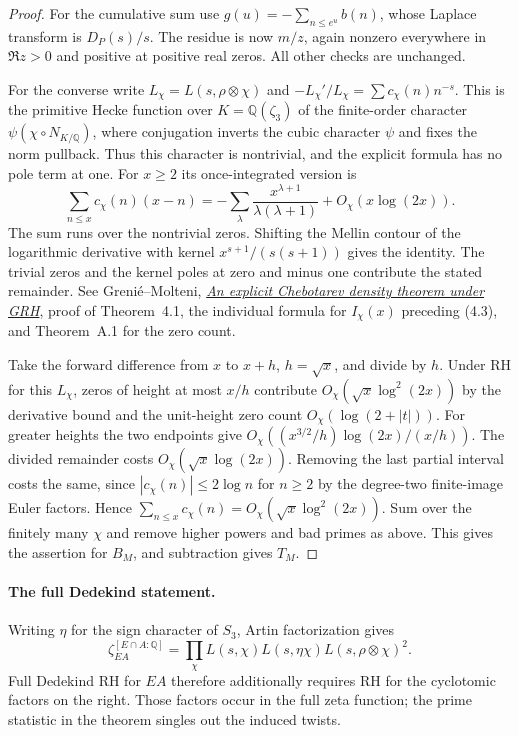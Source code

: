 \documentclass[11pt]{article}
\begin{document}
\begin{proof}
For the cumulative sum use $g(u)=-\sum_{n\le e^u}b(n)$, whose Laplace
transform is $D_P(s)/s$. The residue is now $m/z$, again nonzero
everywhere in $\Re z>0$ and positive at positive real zeros. All other
checks are unchanged.

For the converse write $L_\chi=L(s,\rho\otimes\chi)$ and
$-L_\chi'/L_\chi=\sum c_\chi(n)n^{-s}$. This is the primitive Hecke
function over $K=\mathbb Q(\zeta_3)$ of the finite-order character
$\psi(\chi\circ N_{K/\mathbb Q})$, where conjugation inverts the cubic
character $\psi$ and fixes the norm pullback. Thus this character is
nontrivial, and the explicit formula has no pole term at one.
For $x\ge2$ its once-integrated version is
\[
 \sum_{n\le x}c_\chi(n)(x-n)
 =-\sum_{\lambda}\frac{x^{\lambda+1}}{\lambda(\lambda+1)}
       +O_\chi(x\log(2x)).
\]
The sum runs over the nontrivial zeros. Shifting the Mellin contour of
the logarithmic derivative with kernel $x^{s+1}/(s(s+1))$ gives the
identity. The trivial zeros and the kernel poles at zero and minus one
contribute the stated remainder. See Greni\'e--Molteni,
\href{https://sites.unimi.it/molteni/research/papers-pdf/44-molteni-An_explicit_Chebotarev_density_theorem_under_GRH.pdf}{\emph{An explicit Chebotarev density theorem under GRH}},
proof of Theorem~4.1, the individual formula for $I_\chi(x)$ preceding
(4.3), and Theorem~A.1 for the zero count.

Take the forward difference from $x$ to $x+h$, $h=\sqrt x$, and divide
by $h$. Under RH for this $L_\chi$, zeros of height at most $x/h$ contribute
$O_\chi(\sqrt x\log^2(2x))$ by the derivative bound and the unit-height
zero count $O_\chi(\log(2+|t|))$. For greater heights the two endpoints
give $O_\chi((x^{3/2}/h)\log(2x)/(x/h))$. The divided remainder costs
$O_\chi(\sqrt x\log(2x))$. Removing the last partial interval costs the
same, since $|c_\chi(n)|\le2\log n$ for $n\ge2$ by the degree-two
finite-image Euler factors. Hence
$\sum_{n\le x}c_\chi(n)=O_\chi(\sqrt x\log^2(2x))$.
Sum over the finitely many $\chi$ and remove higher powers and bad primes
as above. This gives the assertion for $B_M$, and subtraction gives $T_M$.
\end{proof}

\paragraph{The full Dedekind statement.}
Writing $\eta$ for the sign character of $S_3$, Artin factorization gives
\[
 \zeta_{EA}^{[E\cap A:\mathbb Q]}
    =\prod_{\chi} L(s,\chi)L(s,\eta\chi)L(s,\rho\otimes\chi)^2 .
\]
Full Dedekind RH for $EA$ therefore additionally requires RH for the
cyclotomic factors on the right. Those factors occur in the full zeta
function; the prime statistic in the theorem singles out the induced twists.
\end{document}
